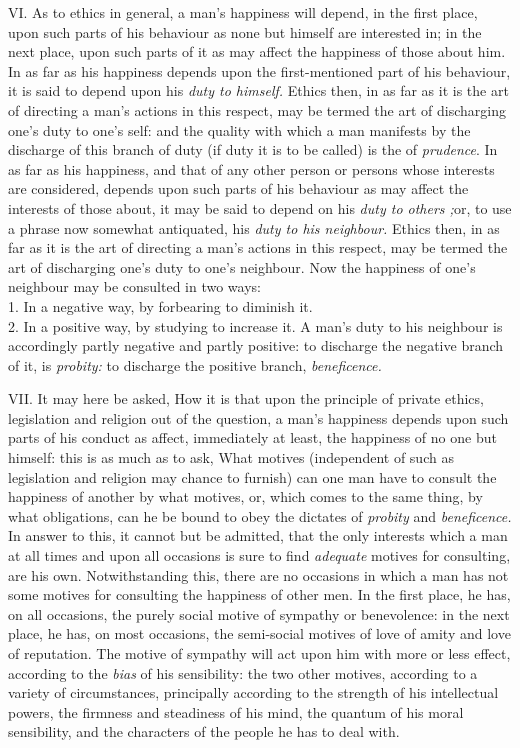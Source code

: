 \documentclass[12pt]{report}
\begin{document}
VI. As to ethics in general, a man's happiness will depend, in the first
place, upon such parts of his behaviour as none but himself are
interested in; in the next place, upon such parts of it as may affect
the happiness of those about him. In as far as his happiness depends
upon the first-mentioned part of his behaviour, it is said to depend
upon his \emph{duty to himself.} Ethics then, in as far as it is the art
of directing a man's actions in this respect, may be termed the art of
discharging one's duty to one's self: and the quality with which a man
manifests by the discharge of this branch of duty (if duty it is to be
called) is the of \emph{prudence}. In as far as his happiness, and that
of any other person or persons whose interests are considered, depends
upon such parts of his behaviour as may affect the interests of those
about, it may be said to depend on his \emph{duty to others ;}or, to use
a phrase now somewhat antiquated, his \emph{duty to his neighbour.}
Ethics then, in as far as it is the art of directing a man's actions in
this respect, may be termed the art of discharging one's duty to one's
neighbour. Now the happiness of one's neighbour may be consulted in two
ways:\\
1. In a negative way, by forbearing to diminish it.\\
2. In a positive way, by studying to increase it. A man's duty to his
neighbour is accordingly partly negative and partly positive: to
discharge the negative branch of it, is \emph{probity:} to discharge the
positive branch, \emph{beneficence.}

VII. It may here be asked, How it is that upon the principle of private
ethics, legislation and religion out of the question, a man's happiness
depends upon such parts of his conduct as affect, immediately at least,
the happiness of no one but himself: this is as much as to ask, What
motives (independent of such as legislation and religion may chance to
furnish) can one man have to consult the happiness of another by what
motives, or, which comes to the same thing, by what obligations, can he
be bound to obey the dictates of \emph{probity} and \emph{beneficence.}
In answer to this, it cannot but be admitted, that the only interests
which a man at all times and upon all occasions is sure to find
\emph{adequate} motives for consulting, are his own. Notwithstanding
this, there are no occasions in which a man has not some motives for
consulting the happiness of other men. In the first place, he has, on
all occasions, the purely social motive of sympathy or benevolence: in
the next place, he has, on most occasions, the semi-social motives of
love of amity and love of reputation. The motive of sympathy will act
upon him with more or less effect, according to the \emph{bias} of his
sensibility: the two other motives, according to a variety of
circumstances, principally according to the strength of his intellectual
powers, the firmness and steadiness of his mind, the quantum of his
moral sensibility, and the characters of the people he has to deal with.
\end{document}
